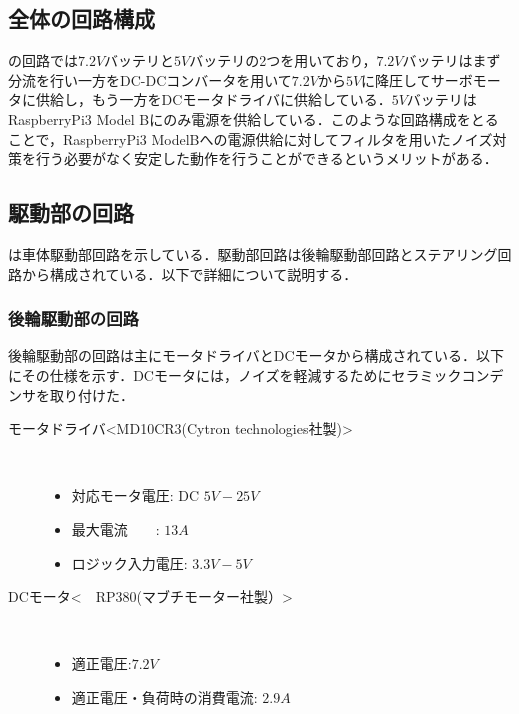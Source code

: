 \subsection{全体の回路構成}

の回路では$7.2\unit{V}$バッテリと$5\unit{V}$バッテリの2つを用いており，$7.2\unit{V}$バッテリはまず分流を行い一方をDC-DCコンバータを用いて$7.2\unit{V}$から$5\unit{V}$に降圧してサーボモータに供給し，もう一方をDCモータドライバに供給している．$5\unit{V}$バッテリはRaspberryPi3 Model Bにのみ電源を供給している．このような回路構成をとることで，RaspberryPi3    ModelBへの電源供給に対してフィルタを用いたノイズ対策を行う必要がなく安定した動作を行うことができるというメリットがある\cite{motor}．


\subsection{駆動部の回路}
は車体駆動部回路を示している．駆動部回路は後輪駆動部回路とステアリング回路から構成されている．以下で詳細について説明する．


\subsubsection{後輪駆動部の回路}
後輪駆動部の回路は主にモータドライバとDCモータから構成されている．以下にその仕様を示す．DCモータには，ノイズを軽減するためにセラミックコンデンサを取り付けた\cite{motor}．
\begin{description}
    \item[モータドライバ\textless MD10CR3(Cytron technologies社製)\textgreater \cite{motordriver}]\mbox{}\\
    \vspace{-5mm}
        \begin{itemize}
            \item 対応モータ電圧: DC $5\unit{V}-25\unit{V}$
            \item 最大電流　　: $13\unit{A}$
            \item ロジック入力電圧: $3.3\unit{V}-5\unit{V}$
        \end{itemize}
     \item[DCモータ\textless　RP380(マブチモーター社製）\textgreater\cite{R380}]\mbox{}\\
     \vspace{-5mm}
         \begin{itemize}
            \item 適正電圧:$7.2\unit{V}$
            \item 適正電圧・負荷時の消費電流: $2.9\unit{A}$
        \end{itemize}
\end{description}

